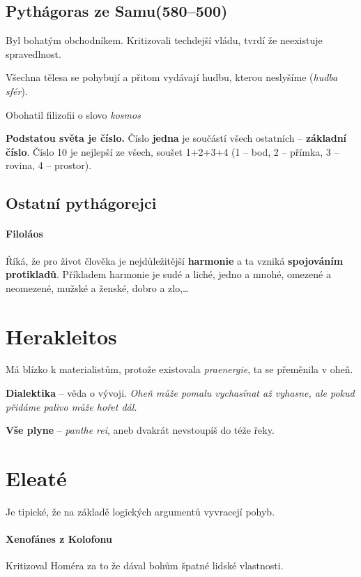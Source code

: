 \documentclass[10pt,a4paper,
twoside,%
]{report}
\begin{document}
\subsection{Pythágoras ze Samu(580--500)} Byl bohatým obchodníkem. Kritizovali techdejší vládu, tvrdí že neexistuje spravedlnost.

Všechna tělesa se pohybují a přitom vydávají hudbu, kterou neslyšíme (\emph{hudba sfér}).

Obohatil filizofii o slovo \emph{kosmos}

\textbf{Podstatou světa je číslo.} Číslo \textbf{jedna} je součástí všech ostatních -- \textbf{základní číslo}. Číslo 10 je nejlepší ze všech, soušet 1+2+3+4 (1 -- bod, 2 -- přímka, 3 -- rovina, 4 -- prostor).

\subsection{Ostatní pythágorejci}
\paragraph{Filoláos} Říká, že pro život člověka je nejdůležitější \textbf{harmonie} a ta vzniká \textbf{spojováním protikladů}. Příkladem harmonie je sudé a liché, jedno a mnohé, omezené a neomezené, mužské a ženské, dobro a zlo,…

\section{Herakleitos}

Má blízko k materialistům, protože existovala \emph{praenergie}, ta se přeměnila v oheň.

\textbf{Dialektika} -- věda o vývoji. \emph{Oheň může pomalu vychasínat až vyhasne, ale pokud přidáme palivo může hořet dál.}

\textbf{Vše plyne} -- \emph{panthe rei}, aneb dvakrát nevstoupíš do téže řeky.

\section[Elejská škola]{Eleaté}

Je tipické, že na základě logických argumentů vyvracejí pohyb.

\paragraph{Xenofánes z Kolofonu} Kritizoval Homéra za to že dával bohům špatné lidské vlastnosti.
\end{document}

